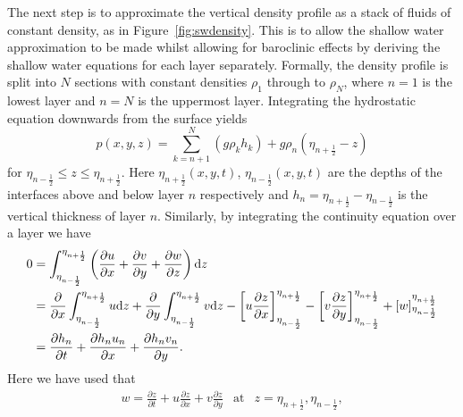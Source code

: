 \documentclass[12pt,a4paper]{report}
\newcommand*\figref[1]{Figure~\ref{#1}}
\newcommand*{\half}{\frac{1}{2}}
\begin{document}
    The next step is to approximate the vertical density profile as a stack of
    fluids of constant density, as in \figref{fig:swdensity}. 
    This is to allow the shallow
    water approximation to be made whilst allowing for baroclinic effects by 
    deriving the shallow water equations for each layer separately. Formally, 
    the density profile is split into $N$ sections with constant densities 
    $\rho_{1}$ through to $\rho_{N}$, where $n=1$ is the lowest layer and $n=N$
    is the uppermost layer. Integrating the hydrostatic equation
    downwards from the surface yields 
    \begin{equation}
    p(x,y,z)=\sum^{N}_{k=n+1}\left(g \rho_{k} h_{k} \right) + g \rho_{n}\left(\eta_{n+\half } - z \right)
    \end{equation}
    for $\eta_{n-\half }\leq z \leq \eta_{n+\half }$. Here $\eta_{n+\half }(x,y,t)$,
    $\eta_{n-\half }(x,y,t)$ are the depths of the interfaces above and below layer $n$
    respectively and $h_{n} = \eta_{n+\half } -\eta_{n-\half }$ is the vertical
     thickness  of layer $n$. Similarly, by integrating the continuity equation over a layer
     we have
     \begin{equation}
     \begin{split}
     0 &=\int^{\eta_{n+\half }}_{\eta_{n-\half }}\left(\frac{\partial u}{\partial x} + \frac{\partial v}{\partial y} +\frac{\partial w}{\partial z} \right){\rm d} z \\
     &=\frac{\partial }{\partial x}\int^{\eta_{n+\half }}_{\eta_{n-\half }} u{\rm d} z +
     \frac{\partial }{\partial y}\int^{\eta_{n+\half }}_{\eta_{n-\half }} v{\rm d} z
      -  \left[ u   \frac{\partial z}{\partial x} \right]^{\eta_{n+\half }}_{\eta_{n-\half }} 
      -  \left[ v  \frac{\partial z}{\partial y}\right]^{\eta_{n+\half }}_{\eta_{n-\half }}  +
      \left[ w \right]^{\eta_{n+\half }}_{\eta_{n-\half }} \\
     &=\frac{\partial h_{n} }{\partial t} +\frac{\partial h_{n} u_{n}}{\partial x}+
     \frac{\partial h_{n} v_{n} }{\partial y}.      \\
     \end{split}
     \end{equation}
   Here we have used that 
   \begin{equation*}
   \begin{array}{ccc}
   w =  \frac{\partial z }{\partial t} + u \frac{\partial z}{\partial x} 
         + v \frac{\partial z}{\partial y} &\mathrm{at}& z = \eta_{n+\half } , \eta_{n-\half },
   \end{array}
   \end{equation*}
\end{document}
